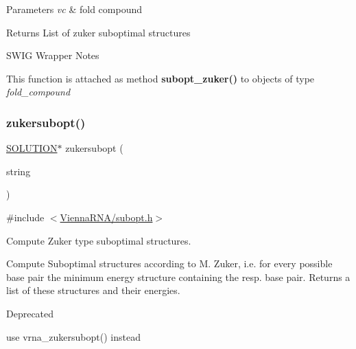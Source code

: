 \begin{DoxyParams}{Parameters}
{\em vc} & fold compound \\
\hline
\end{DoxyParams}
\begin{DoxyReturn}{Returns}
List of zuker suboptimal structures
\end{DoxyReturn}
\begin{DoxyRefDesc}{S\+W\+I\+G Wrapper Notes}
\item[\hyperlink{wrappers__wrappers000092}{S\+W\+I\+G Wrapper Notes}]This function is attached as method {\bfseries subopt\+\_\+zuker()} to objects of type {\itshape fold\+\_\+compound} \end{DoxyRefDesc}
\mbox{\label{group__subopt__zuker_ga0d5104e3ecf119d8eabd40aa5fe47f90}} 
\subsubsection{\texorpdfstring{zukersubopt()}{zukersubopt()}}
{\footnotesize\ttfamily \hyperlink{subopt_8h_aa0f46ff02e1017469cf902d02ecd7f9a}{S\+O\+L\+U\+T\+I\+ON}$\ast$ zukersubopt (\begin{DoxyParamCaption}\item[{const char $\ast$}]{string }\end{DoxyParamCaption})}



{\ttfamily \#include $<$\hyperlink{subopt_8h}{Vienna\+R\+N\+A/subopt.\+h}$>$}



Compute Zuker type suboptimal structures. 

Compute Suboptimal structures according to M. Zuker, i.\+e. for every possible base pair the minimum energy structure containing the resp. base pair. Returns a list of these structures and their energies.

\begin{DoxyRefDesc}{Deprecated}
\item[\hyperlink{deprecated__deprecated000153}{Deprecated}]use vrna\+\_\+zukersubopt() instead\end{DoxyRefDesc}



